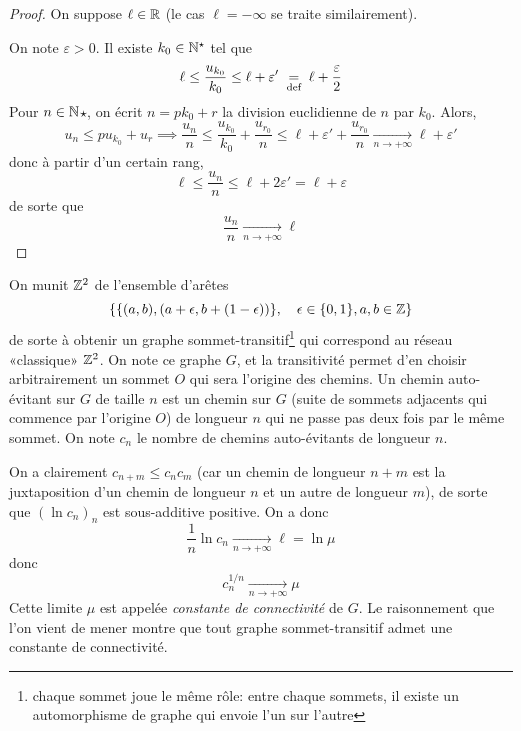 \begin{proof}
    On suppose $\ell\in\mathbb R$ (le cas $\ell=-\infty$ se traite similairement).

    On note $\varepsilon>0$. Il existe $k_0\in\mathbb N^\star$ tel que \[
        \ell\leq \frac{u_{k_0}}{k_0}\leq \ell+\varepsilon'\;\underset{\text{def}}=\;\ell+\frac\varepsilon2
    \]
    Pour $n\in\mathbb N$$\star$, on écrit $n=pk_0+r$ la division euclidienne de $n$ par $k_0$. Alors, \[
        u_n\leq pu_{k_0}+u_r\implies \frac{u_n}n\leq \frac{u_{k_0}}{k_0}+\frac{u_{r_0}}n\leq \ell+\varepsilon'+\frac{u_{r_0}}n\xrightarrow[n\to+\infty]{}\ell+\varepsilon'
    \]
    donc à partir d'un certain rang, \[
        \ell\leq \frac{u_n}n\leq \ell+2\varepsilon'=\ell+\varepsilon
    \]
    de sorte que \[
        \frac{u_n}n\xrightarrow[n\to+\infty]{}\ell
    \]
\end{proof}

\begin{ex}
    On munit $\mathbb Z^2$ de l'ensemble d'arêtes \[\{\{(a, b), (a+\epsilon, b+(1-\epsilon))\}, \quad \epsilon\in\{0,1\}, a,b\in\mathbb Z \}\] de sorte à obtenir un graphe sommet-transitif\footnote{chaque sommet joue le même rôle: entre chaque sommets, il existe un automorphisme de graphe qui envoie l'un sur l'autre} qui correspond au réseau «classique» $\mathbb Z^2$. On note ce graphe $G$, et la transitivité permet d'en choisir arbitrairement un sommet $O$ qui sera l'origine des chemins. Un chemin auto-évitant sur $G$ de taille $n$ est un chemin sur $G$ (suite de sommets adjacents qui commence par l'origine $O$) de longueur $n$ qui ne passe pas deux fois par le même sommet. On note $c_n$ le nombre de chemins auto-évitants de longueur $n$.

    On a clairement $c_{n+m}\leq c_nc_m$ (car un chemin de longueur $n+m$ est la juxtaposition d'un chemin de longueur $n$ et un autre de longueur $m$), de sorte que $(\ln c_n)_n$ est sous-additive positive. On a donc \[
        \frac1n\ln c_n\xrightarrow[n\to+\infty]{}\ell=\ln\mu
    \]
    donc \[
        c_n^{1/n}\xrightarrow[n\to+\infty]{}\mu
    \]
    Cette limite $\mu$ est appelée \emph{constante de connectivité} de $G$. Le raisonnement que l'on vient de mener montre que tout graphe sommet-transitif admet une constante de connectivité.
\end{ex}

